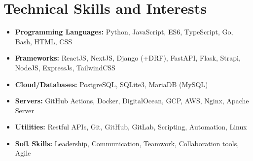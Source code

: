 \section{\textbf{Technical Skills and Interests}}
\begin{itemize}[leftmargin=0.1in, itemsep=0.00in]
    \item{ \textbf{Programming Languages: }{Python, JavaScript, ES6, TypeScript, Go, Bash, HTML, CSS} }
    \item{ \textbf{Frameworks: }{ReactJS, NextJS, Django (+DRF), FastAPI, Flask, Strapi, NodeJS, ExpressJs, TailwindCSS} }
    \item{ \textbf{Cloud/Databases: }{PostgreSQL, SQLite3, MariaDB (MySQL)} }
    \item{ \textbf{Servers: }{GitHub Actions, Docker, DigitalOcean, GCP, AWS, Nginx, Apache Server} }
    \item{ \textbf{Utilities: }{Restful APIs, Git, GitHub, GitLab, Scripting, Automation, Linux} }
    \item{ \textbf{Soft Skills: }{Leadership, Communication, Teamwork, Collaboration tools, Agile} }

\end{itemize}